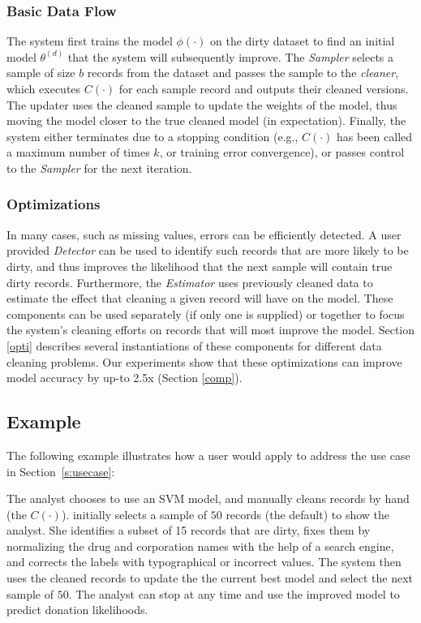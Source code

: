 \subsubsection{Basic Data Flow} \label{df}
The system first trains the model $\phi(\cdot)$ on the dirty dataset to find an initial model $\theta^{(d)}$ that the system will subsequently improve.
The {\it Sampler} selects a sample of size $b$ records from the dataset and passes
the sample to the {\it cleaner}, which executes $C(\cdot)$ for each sample record and outputs their cleaned versions.
The updater uses the cleaned sample to update the weights of the model, thus moving the model closer to the true cleaned model (in expectation).
Finally, the system either terminates due to a stopping condition (e.g., $C(\cdot)$ has been called a maximum number of times $k$, or training error convergence),
or passes control to the {\it Sampler} for the next iteration.

\subsubsection{Optimizations}
In many cases, such as missing values, errors can be efficiently detected.
A user provided {\it Detector} can be used to identify such records that are more likely to be dirty, and thus improves the likelihood that the next sample will contain true dirty records.
Furthermore, the {\it Estimator} uses previously cleaned data to estimate the effect that cleaning a given record will have on the model.
These components can be used separately (if only one is supplied) or together to focus the system's cleaning efforts on records that will most improve the model.
Section \ref{opti} describes several instantiations of these components for different data cleaning problems.
Our experiments show that these optimizations can improve model accuracy by up-to 2.5x (Section \ref{comp}).

\subsection{Example}
The following example illustrates how a user would apply \sys to address the use case in Section~\ref{s:usecase}:
\begin{example}\label{archex}
The analyst chooses to use an SVM model, and manually cleans records by hand (the $C(\cdot)$).  
\sys initially selects a sample of $50$ records (the default)  to show the analyst.
She identifies a subset of 15 records that are dirty, fixes them by normalizing the drug and corporation names with the help of a search engine, and corrects the labels with typographical or incorrect values.
The system then uses the cleaned records to update the the current best model and select the next sample of $50$.
The analyst can stop at any time and use the improved model to predict donation likelihoods.
\end{example}






